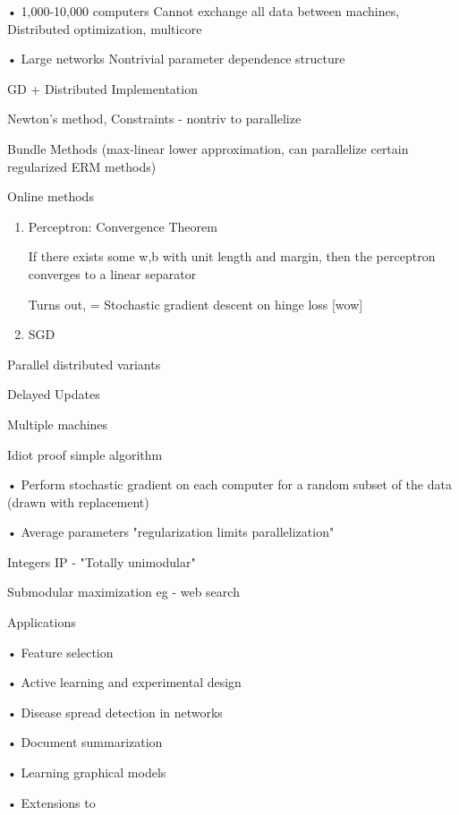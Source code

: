 \documentclass[english]{article}
\begin{document}
• 1,000-10,000 computers
Cannot exchange all data between machines,
Distributed optimization, multicore

• Large networks
Nontrivial parameter dependence structure

\item 
GD + Distributed Implementation

\item Newton's method, Constraints - nontriv to parallelize

\item 
Bundle Methods (max-linear lower approximation, can parallelize certain regularized ERM methods)

\item 
Online methods
\begin{enumerate}
\item Perceptron: Convergence Theorem
    
    If there exists some w,b with unit length and margin, then the perceptron converges to a linear separator
    
    Turns out, = Stochastic gradient descent on hinge loss [wow]
\item  SGD
\end{enumerate}

\item
Parallel distributed variants

Delayed Updates

Multiple machines

Idiot proof simple algorithm

\benum 
\item 
• Perform stochastic gradient on each
computer for a random subset of the data
(drawn with replacement)
\item 
• Average parameters
"regularization limits parallelization"
\eenum 

\item 
Integers
IP - "Totally unimodular"
\item
Submodular maximization
eg - web search
\item  

Applications

• Feature selection

• Active learning and experimental design


• Disease spread detection in networks

• Document summarization

• Learning graphical models

• Extensions to
\end{document}
